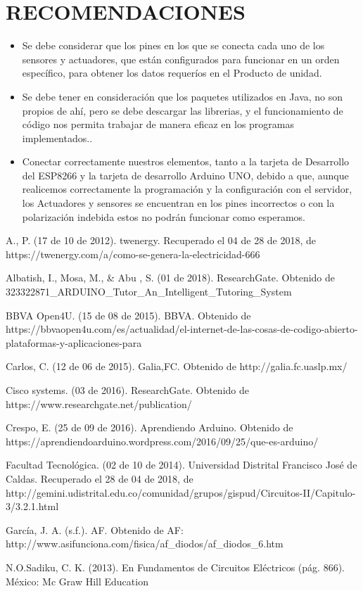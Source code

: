 \documentclass[letterpaper, 10 pt, conference]{ieeeconf}
\begin{document}
\addtolength{\textheight}{-12cm}   

\section{RECOMENDACIONES}
\begin{itemize}
    \item Se debe considerar que los pines en los que se conecta cada uno de los sensores y actuadores, que están configurados para funcionar en un orden específico, para obtener los datos requeríos en el Producto de unidad.
    \item Se debe tener en consideración que los paquetes utilizados en Java, no son propios de ahí, pero se debe descargar las librerias, y el funcionamiento de código nos permita trabajar de manera eficaz en los programas implementados..
    \item Conectar correctamente nuestros elementos, tanto a la tarjeta de Desarrollo del ESP8266 y la tarjeta de desarrollo Arduino UNO, debido a que, aunque realicemos correctamente la programación y la configuración con el servidor, los Actuadores y sensores se encuentran en los pines incorrectos o con la polarización indebida estos no podrán funcionar como esperamos.
\end{itemize}

\begin{thebibliography}{99}

A., P. (17 de 10 de 2012). twenergy. Recuperado el 04 de 28 de 2018, de https://twenergy.com/a/como-se-genera-la-electricidad-666

Albatish, I., Mosa, M., & Abu , S. (01 de 2018). ResearchGate. Obtenido de 323322871_ARDUINO_Tutor_An_Intelligent_Tutoring_System

BBVA Open4U. (15 de 08 de 2015). BBVA. Obtenido de https://bbvaopen4u.com/es/actualidad/el-internet-de-las-cosas-de-codigo-abierto-plataformas-y-aplicaciones-para

Carlos, C. (12 de 06 de 2015). Galia,FC. Obtenido de http://galia.fc.uaslp.mx/

Cisco systems. (03 de 2016). ResearchGate. Obtenido de https://www.researchgate.net/publication/

Crespo, E. (25 de 09 de 2016). Aprendiendo Arduino. Obtenido de https://aprendiendoarduino.wordpress.com/2016/09/25/que-es-arduino/

 Facultad Tecnológica. (02 de 10 de 2014). Universidad Distrital Francisco José de Caldas. Recuperado el 28 de 04 de 2018, de http://gemini.udistrital.edu.co/comunidad/grupos/gispud/Circuitos-II/Capitulo-3/3.2.1.html

García, J. A. (s.f.). AF. Obtenido de AF: http://www.asifunciona.com/fisica/af_diodos/af_diodos_6.htm

N.O.Sadiku, C. K. (2013). En Fundamentos de Circuitos Eléctricos (pág. 866). México: Mc Graw Hill Education
\end{thebibliography}
\end{document}
